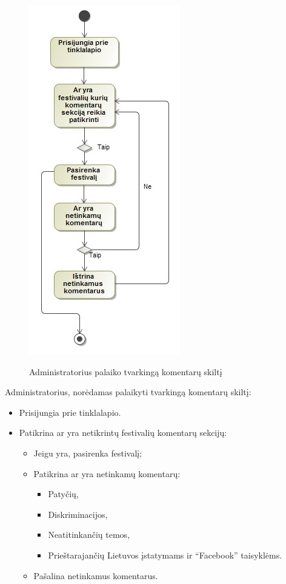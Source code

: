 \documentclass{VUMIFPSkursinis}
\begin{document}
\begin{figure}[H]
    \centering
    \includegraphics[scale=0.7]{img/geri/adminKom}
    \label{img:uml15}
	\caption{Administratorius palaiko tvarkingą komentarų skiltį}
\end{figure}

Administratorius, norėdamas palaikyti tvarkingą komentarų skiltį:
\begin{itemize}
\item Prisijungia prie tinklalapio.
\item Patikrina ar yra netikrintų festivalių komentarų sekcijų:
\begin{itemize}
\item Jeigu yra, pasirenka festivalį;
\item Patikrina ar yra netinkamų komentarų:
\begin{itemize}
\item Patyčių,
\item Diskriminacijos,
\item Neatitinkančių temos,
\item Prieštarajančių Lietuvos įstatymams ir “Facebook” taisyklėms.
\end{itemize}
\item Pašalina netinkamus komentarus.	
\end{itemize}
\end{itemize}
\end{document}
